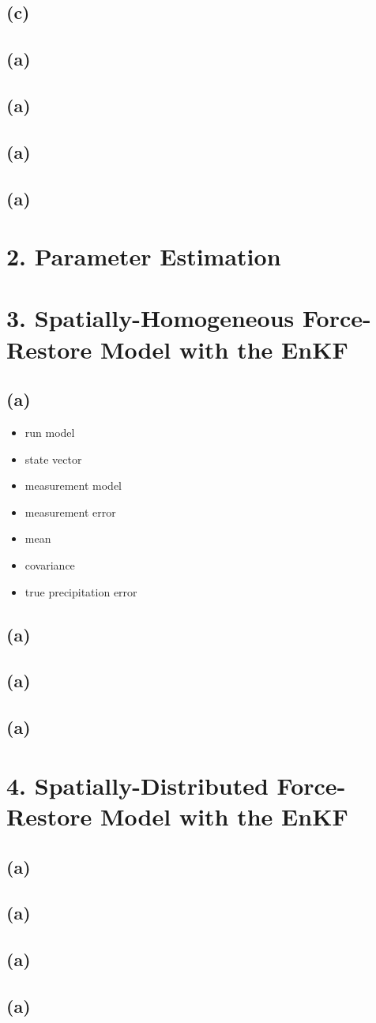 \documentclass[letterpaper]{tufte-handout}
\begin{document}
\subsection{(c)}
\subsection{(a)}
\subsection{(a)}
\subsection{(a)}
\subsection{(a)}
\section{2. Parameter Estimation}
\section{3. Spatially-Homogeneous Force-Restore Model with the EnKF}
\subsection{(a)}
\begin{itemize}
  \item run model
  \item state vector
  \item measurement model
  \item measurement error
  \item mean
  \item covariance
  \item true precipitation error
\end{itemize}
\subsection{(a)}
\subsection{(a)}
\subsection{(a)}
\section{4. Spatially-Distributed Force-Restore Model with the EnKF}
\subsection{(a)}
\subsection{(a)}
\subsection{(a)}
\subsection{(a)}
\end{document}
